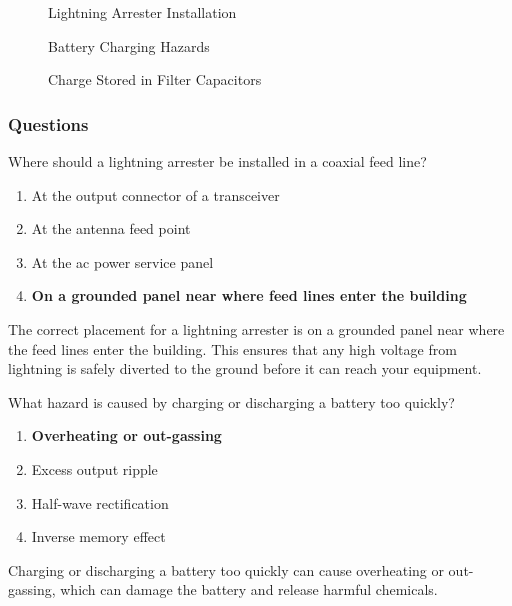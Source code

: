 \begin{figure}[h]
    \centering
    \caption{Lightning Arrester Installation}
    \label{fig:lightning-arrester}
\end{figure}

\begin{figure}[h]
    \centering
    \caption{Battery Charging Hazards}
    \label{fig:battery-hazards}
\end{figure}

\begin{figure}[h]
    \centering
    \caption{Charge Stored in Filter Capacitors}
    \label{fig:capacitor-charge}
\end{figure}

\subsubsection*{Questions}
\begin{tcolorbox}[colback=gray!10!white,colframe=black!75!black,title={T0A07}]
    Where should a lightning arrester be installed in a coaxial feed line?
    \begin{enumerate}[label=\Alph*),noitemsep]
        \item At the output connector of a transceiver
        \item At the antenna feed point
        \item At the ac power service panel
        \item \textbf{On a grounded panel near where feed lines enter the building}
    \end{enumerate}
\end{tcolorbox}
The correct placement for a lightning arrester is on a grounded panel near where the feed lines enter the building. This ensures that any high voltage from lightning is safely diverted to the ground before it can reach your equipment.

\begin{tcolorbox}[colback=gray!10!white,colframe=black!75!black,title={T0A10}]
    What hazard is caused by charging or discharging a battery too quickly?
    \begin{enumerate}[label=\Alph*),noitemsep]
        \item \textbf{Overheating or out-gassing}
        \item Excess output ripple
        \item Half-wave rectification
        \item Inverse memory effect
    \end{enumerate}
\end{tcolorbox}
Charging or discharging a battery too quickly can cause overheating or out-gassing, which can damage the battery and release harmful chemicals.

